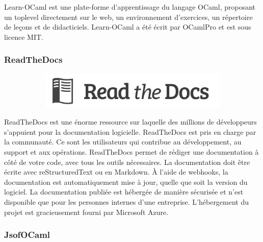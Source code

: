 \documentclass{article}
\begin{document}
Learn-OCaml est une plate-forme d’apprentissage du langage OCaml, proposant un toplevel directement sur le web, un environnement d’exercices, un répertoire de leçons et de didacticiels.
Learn-OCaml a été écrit par OCamlPro et est sous licence MIT.

\subsubsection{ReadTheDocs}
\begin{figure}[h!]
	\centering
  	\begin{subfigure}[b]{0.55\linewidth}
	\includegraphics[width=\linewidth]{rtd.png}
  	\end{subfigure}
\end{figure}

ReadTheDocs est une énorme ressource sur laquelle des millions de développeurs s'appuient pour la documentation logicielle.
\newline
ReadTheDocs est pris en charge par la communauté. Ce sont les utilisateurs qui contribue au développement, au support et aux opérations.
ReadTheDocs permet de rédiger une documentation à côté de votre code, avec tous les outils nécessaires. La documentation doit être écrite avec reStructuredText ou en Markdown.
\newline
À l'aide de webhooks, la documentation est automatiquement mise à jour, quelle que soit la version du logiciel.
La documentation publiée est hébergée de manière sécurisée et n'est disponible que pour les personnes internes d'une entreprise.
L'hébergement du projet est gracieusement fourni par Microsoft Azure.

\subsubsection{JsofOCaml}
\end{document}
